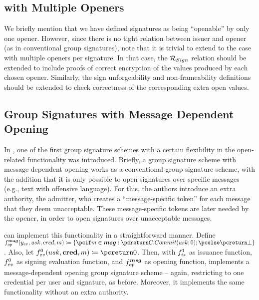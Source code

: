 \subsection{\UAS with Multiple Openers}
We briefly mention that we have defined \UAS signatures as being ``openable'' by
only one opener. However, since there is no tight relation between issuer and
opener (as in conventional group signatures), note that it is trivial to extend
to the case with multiple openers per signature. In that case, the
$\mathcal{R}_{Sign}$ relation should be extended to include proofs of correct
encryption of the \yinsp values produced by each chosen opener.
Similarly, the sign unforgeability and non-frameability definitions should be
extended to check correctness of the corresponding extra open values.

\subsection{Group Signatures with Message Dependent Opening}

In \cite{khk+19}, one of the first group signature schemes with a certain
flexibility in the open-related functionality was introduced. Briefly, a group
signature scheme with message dependent opening works as a conventional group
signature scheme, with the addition that it is only possible to open signatures
over specific messages (e.g., text with offensive language). For this, the
authors introduce an extra authority, the admitter, who creates a
``message-specific token'' for each message that they deem unacceptable.
These message-specific tokens are later needed by the opener, in order to open
signatures over unacceptable messages.

\UAS can implement this functionality in a straightforward manner. Define
$\finsp^{\smsg}(\yeval,\usk,\cred,\msg) \coloneqq \lbrace \pcif \msg \in \smsg:
\pcreturn \CCommit(\usk;0); \pcelse \pcreturn \bot \rbrace$. Also, let
$\feval^0(\usk,\scred,\msg) \coloneqq \pcreturn 0$. Then, \UAS with $f_{is}^1$
as issuance function, $f_{ev}^0$ as signing evaluation function, and
$f_{op}^{\boldsymbol{msg}}$ as opening function, implements a message-dependent opening
group signature scheme -- again, restricting to one credential per user and
signature, as before. Moreover, it implements the same functionality without
an extra authority.


